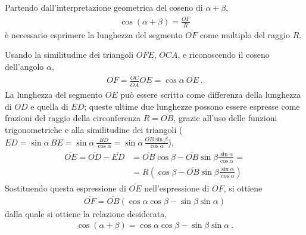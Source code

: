 \documentclass[letterpaper,10pt,english]{jupyterBook}
\begin{document}
\begin{figure}[htbp]
\centering

\noindent{}
\end{figure}

\sphinxAtStartPar
Partendo dall’interpretazione geometrica del coseno di \(\alpha + \beta\),
\begin{equation*}
\begin{split}\cos ( \alpha + \beta ) = \frac{\overline{OF}}{R}\end{split}
\end{equation*}
\sphinxAtStartPar
è necessario esprimere la lunghezza del segmento \(OF\) come multiplo del raggio \(R\).



\sphinxAtStartPar
Usando la similitudine dei triangoli \(OFE\), \(OCA\), e riconoscendo il coseno dell’angolo \(\alpha\),
\begin{equation*}
\begin{split}\overline{OF} = \frac{\overline{OC}}{\overline{OA}} \overline{OE} = \cos \alpha \ \overline{OE} \ .\end{split}
\end{equation*}
\sphinxAtStartPar
La lunghezza del segmento \(OE\) può essere scritta come differenza della lunghezza di \(OD\) e quella di \(ED\); queste ultime due lunghezze possono essere espresse come frazioni del raggio della circonferenza \(R = \overline{OB}\), grazie all’uso delle funzioni trigonometriche e alla similitudine dei triangoli (\(\overline{ED} = \sin \alpha \, \overline{BE} = \sin \alpha \, \frac{\overline{BD}}{\cos \alpha} = \sin \alpha \, \frac{\overline{OB} \sin \beta}{\cos \alpha}\)),
\begin{equation*}
\begin{split}\begin{aligned}
\overline{OE} = \overline{OD} - \overline{ED} & = \overline{OB} \cos \beta - \overline{OB} \sin \beta \frac{\sin \alpha}{\cos \alpha} = \\
& = R \left( \cos \beta - \overline{OB} \sin \beta \frac{\sin \alpha}{\cos \alpha} \right)
\end{aligned}\end{split}
\end{equation*}
\sphinxAtStartPar
Sostituendo questa espressione di \(\overline{OE}\) nell’espressione di \(\overline{OF}\), si ottiene
\begin{equation*}
\begin{split}\overline{OF} = \overline{OB} \left( \cos \alpha \cos \beta - \sin \beta \sin \alpha  \right)\end{split}
\end{equation*}
\sphinxAtStartPar
dalla quale si ottiene la relazione desiderata,
\begin{equation*}
\begin{split}\cos (\alpha + \beta) = \cos \alpha \cos \beta - \sin \beta \sin \alpha \ .\end{split}
\end{equation*}
\end{document}
